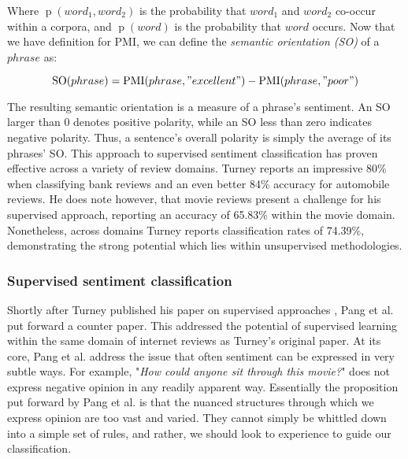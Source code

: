 Where $\operatorname{p}(word_1,word_2)$ is the probability that $word_1$ and $word_2$ co-occur within a corpora, and $\operatorname{p}(word)$ is the probability that $word$ occurs. Now that we have definition for PMI, we can define the \emph{semantic orientation (SO)} of a $phrase$ as:

\begin{equation}
	\operatorname{SO}(phrase) = \operatorname{PMI}(phrase, "excellent") - \operatorname{PMI}(phrase, "poor")
\end{equation}

The resulting semantic orientation is a measure of a phrase's sentiment. An SO larger than 0 denotes positive polarity, while an SO less than zero indicates negative polarity. Thus, a sentence's overall polarity is simply the average of its phrases' SO. This approach to supervised sentiment classification has proven effective across a variety of review domains. Turney reports an impressive 80\% when classifying bank reviews and an even better 84\% accuracy for automobile reviews. He does note however, that movie reviews present a challenge for his supervised approach, reporting an accuracy of 65.83\% within the movie domain. Nonetheless, across domains Turney reports classification rates of 74.39\%, demonstrating the strong potential which lies within unsupervised methodologies.

\subsubsection{Supervised sentiment classification}

Shortly after Turney published his paper on supervised approaches \cite{Turney:2002vv}, Pang et al. \cite{Pang:2002tu} put forward a counter paper. This addressed the potential of supervised learning within the same domain of internet reviews as Turney's original paper. At its core, Pang et al. address the issue that often sentiment can be expressed in very subtle ways. For example, "\emph{How could anyone sit through this movie?}" does not express negative opinion in any readily apparent way. Essentially the proposition put forward by Pang et al. is that the nuanced structures through which we express opinion are too vast and varied. They cannot simply be whittled down into a simple set of rules, and rather, we should look to experience to guide our classification.

